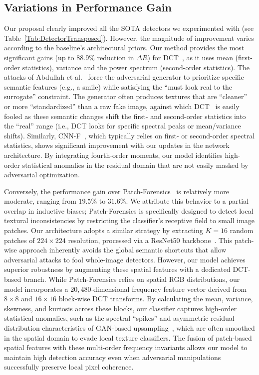 \documentclass[letterpaper,twocolumn,10pt]{article}
\begin{document}
\subsection{Variations in Performance Gain}
Our proposal clearly improved all the SOTA detectors we experimented with (see Table~\ref{Tab:DetectorTransposed}). However, the magnitude of improvement varies according to the baseline's architectural priors. Our method provides the most significant gains (up to $88.9\%$ reduction in $\Delta R$) for DCT~\cite{Ricker2024detection}, as it uses mean (first-order statistics), variance and the power spectrum (second-order statistics). The attacks of Abdullah et al.~\cite{Sifat2024evolvingthreat} force the adversarial generator to prioritize specific semantic features (e.g., a smile) while satisfying the ``must look real to the surrogate'' constraint. The generator often produces textures that are ``cleaner'' or more ``standardized'' than a raw fake image, against which DCT~\cite{Ricker2024detection} is easily fooled as these semantic changes shift the first- and second-order statistics into the ``real'' range (i.e., DCT looks for specific spectral peaks or mean/variance shifts). 
%
Similarly,  CNN-F~\cite{Wang2024cnngenerated}, which typically relies on first- or second-order spectral statistics, shows significant improvement with our updates in the network architecture. By integrating fourth-order moments, our model identifies high-order statistical anomalies in the residual domain that are not easily masked by adversarial optimization. 

Conversely, the performance gain over Patch-Forensics~\cite{chai2020makesfakeimagesdetectable} is relatively more moderate, ranging from $19.5\%$ to $31.6\%$. We attribute this behavior to a partial overlap in inductive biases; Patch-Forensics is specifically designed to detect local textural inconsistencies by restricting the classifier's receptive field to small image patches. Our architecture adopts a similar strategy by extracting $K=16$ random patches of $224 \times 224$ resolution, processed via a ResNet50 backbone~\cite{he2016deep}. This patch-wise approach inherently avoids the global semantic shortcuts that allow adversarial attacks to fool whole-image detectors. However, our model achieves superior robustness by augmenting these spatial features with a dedicated DCT-based branch. While Patch-Forensics relies on spatial RGB distributions, our model incorporates a $20,480$-dimensional frequency feature vector derived from $8 \times 8$ and $16 \times 16$ block-wise DCT transforms. By calculating the mean, variance, skewness, and kurtosis across these blocks, our %
classifier captures high-order statistical anomalies, such as the spectral ``spikes'' and asymmetric residual distribution characteristics of GAN-based upsampling~\cite{frank2020leveraging, Wang2024cnngenerated}, which are often smoothed in the spatial domain to evade local texture classifiers. The fusion of patch-based spatial features with these multi-order frequency invariants allows our model to maintain high detection accuracy even when adversarial manipulations successfully preserve local pixel coherence.
\end{document}
